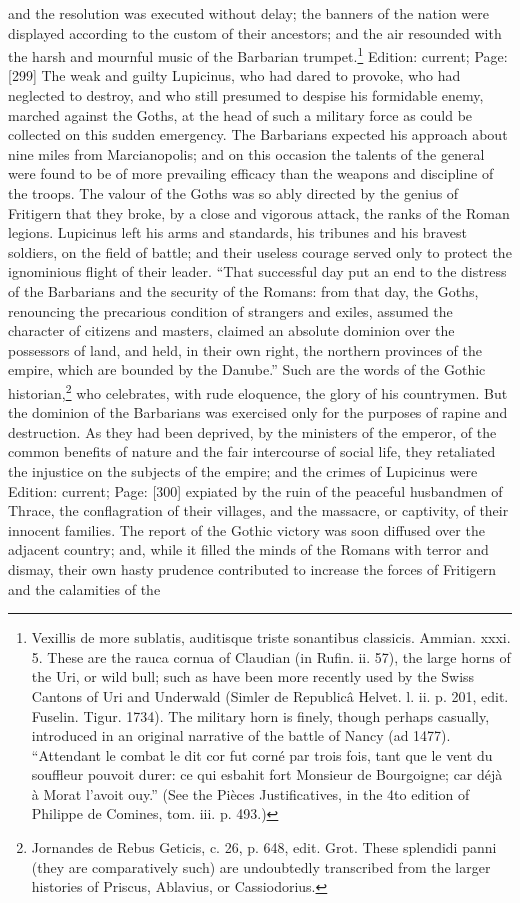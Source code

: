 and the resolution was executed without delay; the banners of the nation were displayed according to the custom of their ancestors; and the air resounded with the harsh and mournful music of the Barbarian trumpet.\footnote{Vexillis de more sublatis, auditisque triste sonantibus classicis. Ammian. xxxi. 5. These are the rauca cornua of Claudian (in Rufin. ii. 57), the large horns of the Uri, or wild bull; such as have been more recently used by the Swiss Cantons of Uri and Underwald (Simler de Republicâ Helvet. l. ii. p. 201, edit. Fuselin. Tigur. 1734). The military horn is finely, though perhaps casually, introduced in an original narrative of the battle of Nancy (ad 1477). \texthebrew{“}Attendant le combat le dit cor fut corné par trois fois, tant que le vent du souffleur pouvoit durer: ce qui esbahit fort Monsieur de Bourgoigne; car déjà à Morat l\texthebrew{}’avoit ouy.\texthebrew{}” (See the Pièces Justificatives, in the 4to edition of Philippe de Comines, tom. iii. p. 493.)} Edition: current; Page: [299] The weak and guilty Lupicinus, who had dared to provoke, who had neglected to destroy, and who still presumed to despise his formidable enemy, marched against the Goths, at the head of such a military force as could be collected on this sudden emergency. The Barbarians expected his approach about nine miles from Marcianopolis; and on this occasion the talents of the general were found to be of more prevailing efficacy than the weapons and discipline of the troops. The valour of the Goths was so ably directed by the genius of Fritigern that they broke, by a close and vigorous attack, the ranks of the Roman legions. Lupicinus left his arms and standards, his tribunes and his bravest soldiers, on the field of battle; and their useless courage served only to protect the ignominious flight of their leader. \texthebrew{“}That successful day put an end to the distress of the Barbarians and the security of the Romans: from that day, the Goths, renouncing the precarious condition of strangers and exiles, assumed the character of citizens and masters, claimed an absolute dominion over the possessors of land, and held, in their own right, the northern provinces of the empire, which are bounded by the Danube.\texthebrew{}” Such are the words of the Gothic historian,\footnote{Jornandes de Rebus Geticis, c. 26, p. 648, edit. Grot. These splendidi panni (they are comparatively such) are undoubtedly transcribed from the larger histories of Priscus, Ablavius, or Cassiodorius.} who celebrates, with rude eloquence, the glory of his countrymen. But the dominion of the Barbarians was exercised only for the purposes of rapine and destruction. As they had been deprived, by the ministers of the emperor, of the common benefits of nature and the fair intercourse of social life, they retaliated the injustice on the subjects of the empire; and the crimes of Lupicinus were Edition: current; Page: [300] expiated by the ruin of the peaceful husbandmen of Thrace, the conflagration of their villages, and the massacre, or captivity, of their innocent families. The report of the Gothic victory was soon diffused over the adjacent country; and, while it filled the minds of the Romans with terror and dismay, their own hasty prudence contributed to increase the forces of Fritigern and the calamities of the 